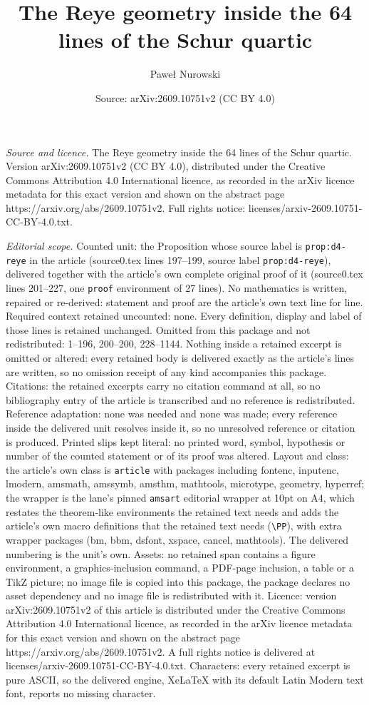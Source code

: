 \documentclass[10pt,a4paper]{amsart}
\title[The Reye geometry inside the 64 lines of the Schur quartic]{The Reye geometry inside the 64 lines of the Schur quartic}
\author{Pawe\l{} Nurowski}
\date{Source: arXiv:2609.10751v2 (CC BY 4.0)}
\begin{document}
\maketitle

\noindent\emph{Source and licence.} The Reye geometry inside the 64 lines of the Schur quartic. Version arXiv:2609.10751v2 (CC BY 4.0), distributed under the Creative Commons Attribution 4.0 International licence, as recorded in the arXiv licence metadata for this exact version and shown on the abstract page https://arxiv.org/abs/2609.10751v2. Full rights notice: licenses/arxiv-2609.10751-CC-BY-4.0.txt.\par\smallskip

\noindent\textit{Editorial scope.} Counted unit: the Proposition whose source label is \texttt{prop:d4-reye} in the article (source0.tex lines 197--199, source label \texttt{prop:d4-reye}), delivered together with the article's own complete original proof of it (source0.tex lines 201--227, one \texttt{proof} environment of 27 lines). No mathematics is written, repaired or re-derived: statement and proof are the article's own text line for line. Required context retained uncounted: none. Every definition, display and label of those lines is retained unchanged. Omitted from this package and not redistributed: 1--196, 200--200, 228--1144. Nothing inside a retained excerpt is omitted or altered: every retained body is delivered exactly as the article's lines are written, so no omission receipt of any kind accompanies this package. Citations: the retained excerpts carry no citation command at all, so no bibliography entry of the article is transcribed and no reference is redistributed. Reference adaptation: none was needed and none was made; every reference inside the delivered unit resolves inside it, so no unresolved reference or citation is produced. Printed slips kept literal: no printed word, symbol, hypothesis or number of the counted statement or of its proof was altered. Layout and class: the article's own class is \texttt{article} with packages including fontenc, inputenc, lmodern, amsmath, amssymb, amsthm, mathtools, microtype, geometry, hyperref; the wrapper is the lane's pinned \texttt{amsart} editorial wrapper at 10pt on A4, which restates the theorem-like environments the retained text needs and adds the article's own macro definitions that the retained text needs (\texttt{\textbackslash PP}), with extra wrapper packages (bm, bbm, dsfont, xspace, cancel, mathtools). The delivered numbering is the unit's own. Assets: no retained span contains a figure environment, a graphics-inclusion command, a PDF-page inclusion, a table or a TikZ picture; no image file is copied into this package, the package declares no asset dependency and no image file is redistributed with it. Licence: version arXiv:2609.10751v2 of this article is distributed under the Creative Commons Attribution 4.0 International licence, as recorded in the arXiv licence metadata for this exact version and shown on the abstract page https://arxiv.org/abs/2609.10751v2. A full rights notice is delivered at licenses/arxiv-2609.10751-CC-BY-4.0.txt. Characters: every retained excerpt is pure ASCII, so the delivered engine, XeLaTeX with its default Latin Modern text font, reports no missing character.
\end{document}
